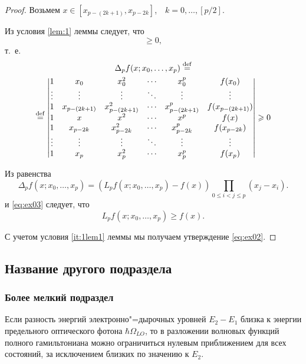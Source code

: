 \documentclass[bachelor, och, coursework, times]{SCWorks}
\newcommand{\eqdef}{\stackrel {\rm def}{=}}
\begin{document}
\begin{proof}
    Возьмем $x \in [x_{p-(2k+1)},x_{p-2k}]$,\ \ $k=0,\ldots,\left[p/2
    \right]$.

    Из условия \ref{lem:1} леммы следует, что
    \begin{displaymath}
        [x_0,\ldots,x_{p-(2k+1)},x,x_{p-2k},\ldots,x_p;f] \geqslant
        0,
    \end{displaymath}
    т.~е.
    \begin{multline}\label{eq:ex03}
     \Delta_pf(x;x_0,\ldots,x_p)\eqdef
     \\ \eqdef
      \begin{vmatrix}
       1 & x_0   & x_0^2 & \cdots & x_0^p & f(x_0) \\
       \vdots  & \vdots & \vdots & \ddots & \vdots & \vdots \\
       1 & x_{p-(2k+1)} & x_{p-(2k+1)}^2 & \cdots & x_{p-(2k+1)}^p & f(x_{p-(2k+1)}) \\
       1 & x & x^2 & \cdots & x^p & f(x) \\
       1 & x_{p-2k} & x_{p-2k}^2 & \cdots & x_{p-2k}^p & f(x_{p-2k}) \\
       \vdots  & \vdots & \vdots & \ddots & \vdots & \vdots \\
       1 & x_p & x_p^2 & \cdots & x_p^p & f(x_p) \\
      \end{vmatrix}
      \geqslant 0
    \end{multline}

    Из равенства
    \begin{equation*}
        \Delta_p f(x;x_0,\ldots,x_p)=(L_pf(x;x_0,\ldots,x_p)-f(x))
        \prod_{0\leqslant i<j\leqslant p}(x_j-x_i).
    \end{equation*}
	и \eqref{eq:ex03} следует, что
    \begin{displaymath}
        L_pf(x;x_0,\ldots,x_p)\geqslant f(x).
    \end{displaymath}

    С учетом условия \ref{it:1lem1} леммы мы получаем утверждение \eqref{eq:ex02}.
\end{proof}

\subsection{Название другого подраздела}
\subsubsection{Более мелкий подраздел}
Если разность энергий электронно"=дырочных уровней $E_2-E_1$ близка к энергии предельного оптического фотона $\hbar\Omega_{LO}$, то в разложении волновых функций полного гамильтониана можно ограничиться нулевым приближением для всех состояний, за исключением близких по значению к $E_2$.
\end{document}

